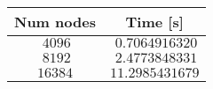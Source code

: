 \begin{center}
\begin{tabular}{cc}
\toprule
\multicolumn{1}{c}{Num nodes}&\multicolumn{1}{c}{Time [s]}\tabularnewline
\midrule
$~4096$&$~0.7064916320$\tabularnewline
$~8192$&$~2.4773848331$\tabularnewline
$16384$&$11.2985431679$\tabularnewline
\bottomrule
\end{tabular}\end{center}
